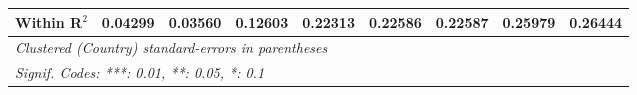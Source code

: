 \begin{table}[htbp]
\begin{tabular}{lcccccccc}
      Within R$^2$                                                     & 0.04299       & 0.03560  & 0.12603      & 0.22313        & 0.22586        & 0.22587        & 0.25979        & 0.26444\\  
      \midrule \midrule
      \multicolumn{9}{l}{\emph{Clustered (Country) standard-errors in parentheses}}\\
      \multicolumn{9}{l}{\emph{Signif. Codes: ***: 0.01, **: 0.05, *: 0.1}}\\
   \end{tabular}
\end{table}


